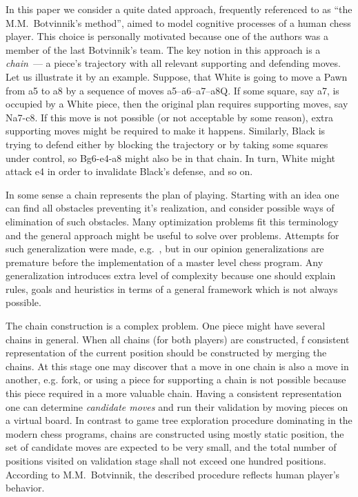 \documentclass{llncs}
\begin{document}
In this paper we consider a quite dated approach, frequently referenced to
as ``the M.M.~Botvinnik's method'', aimed to model cognitive processes
of a human chess player. This choice is personally motivated because
one of the authors was a member of the last Botvinnik's team.  The key
notion in this approach is a \emph{chain}~--- a piece's trajectory
with all relevant supporting and defending moves. Let us illustrate it
by an example. Suppose, that White is going to move a Pawn from a5 to a8
by a sequence of moves a5--a6--a7--a8Q. If some square, say a7, is
occupied by a White piece, then the original plan requires
supporting moves, say Na7-c8. If this move is not possible (or not
acceptable by some reason), extra supporting moves might be required
to make it happens. Similarly, Black is trying to defend either by
blocking the trajectory or by taking some squares under control, so
Bg6-e4-a8 might also be in that chain. In turn, White might attack e4
in order to invalidate Black's defense, and so on.

In some sense a chain represents the plan of playing. Starting with an
idea one can find all obstacles preventing it's realization, and
consider possible ways of elimination of such obstacles. Many
optimization problems fit this terminology and the general approach
might be useful to solve over problems. Attempts for such
generalization were made, e.g.~\cite{Botvinnik:1984,Botvinnik1970,Stilman:2000:LGS},
but in our opinion generalizations are premature before the
implementation of a master level chess program. Any generalization
introduces extra level of complexity because one should explain rules,
goals and heuristics in terms of a general framework which is not
always possible.

The chain construction is a complex problem. One piece might have several
chains in general. When all chains (for both players) are constructed,
f consistent representation of the current position should be
constructed by merging the chains. At this stage one may discover that
a move in one chain is also a move in another, e.g. fork, or using a
piece for supporting a chain is not possible because this piece
required in a more valuable chain. Having a consistent representation
one can determine \emph{candidate moves} and run their validation by
moving pieces on a virtual board.
%
In contrast to game tree exploration procedure dominating in the
modern chess programs, chains are constructed using mostly static
position, the set of candidate moves are expected to be very small,
and the total number of positions visited on validation stage shall
not exceed one hundred positions. According to M.M.~Botvinnik, the
described procedure reflects human player's behavior.
\end{document}

